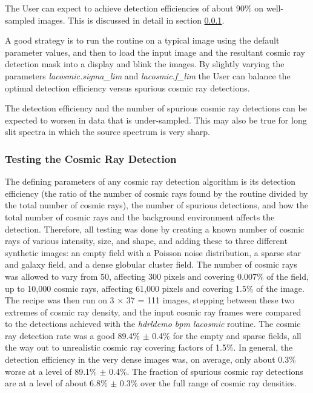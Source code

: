 The User can expect to achieve detection efficiencies of about 90\% on well-sampled images.   This is discussed
in detail in section \ref{sect:testing_CR}.

A good strategy is to run the routine on a typical image using the default parameter values, and then to load the
input image and the resultant cosmic ray detection mask into a display and blink the images.  By slightly varying
the parameters {\em lacosmic.sigma\_lim} and {\em lacosmic.f\_lim} the User can balance the optimal detection
efficiency versus spurious cosmic ray detections.

The detection efficiency and the number of spurious cosmic ray detections can be expected to worsen in data that
is under-sampled.   This may also be true for long slit spectra in which the source spectrum is very sharp.



\subsubsection{Testing the Cosmic Ray Detection}
\label{sect:testing_CR}

The defining parameters of any cosmic ray detection algorithm is its detection efficiency 
(the ratio of the number of cosmic rays found by the routine divided by the total number of cosmic rays), 
the number of spurious detections, and how the total number of cosmic rays and the background environment 
affects the detection.  Therefore, all testing was done by creating a known 
number of cosmic rays of various intensity, size, and shape, and adding these to three different synthetic 
images: an empty field with a Poisson noise distribution, a sparse star and galaxy field, and a dense globular 
cluster field.  The number of cosmic rays was allowed to vary from 50, affecting 300 pixels and covering 0.007\% of 
the field, up to 10,000 cosmic rays, affecting 61,000 pixels and covering 1.5\% of the image.
The recipe was then run on 3 $\times$ 37 = 111 images, stepping between these two extremes of cosmic ray density, and the input cosmic ray 
frames were compared to the detections achieved with the {\em hdrldemo bpm lacosmic} routine. The cosmic ray detection rate was 
a good 89.4\% $\pm$ 0.4\% for the empty and sparse fields, all the way out to unrealistic cosmic ray covering factors of 1.5\%. 
In general, the detection efficiency in the very dense images was, on average, only about 0.3\% worse at a level of 89.1\% $\pm$ 0.4\%. 
The fraction of spurious cosmic ray detections are at a level of about 6.8\% $\pm$ 0.3\% over the full range of cosmic ray densities.

